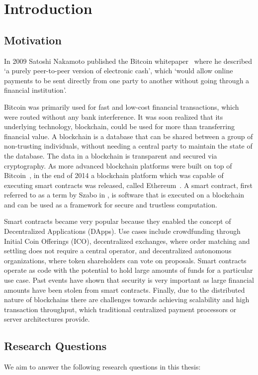 \chapter{Introduction}

\section{Motivation}
In 2009 Satoshi Nakamoto published the Bitcoin whitepaper~\cite{bitcoin} where he described `a purely peer-to-peer version of electronic cash', which `would allow online payments to be sent directly from one party to another without going through a financial institution'. 

Bitcoin was primarily used for fast and low-cost financial transactions, which were routed without any bank interference. It was soon realized that its underlying technology, blockchain, could be used for more than transferring financial value. A blockchain is a database that can be shared between a group of non-trusting individuals, without needing a central party to maintain the state of the database. The data in a blockchain is transparent and secured via cryptography. As more advanced blockchain platforms were built on top of Bitcoin~\cite{colored}, in the end of 2014 a blockchain platform which was capable of executing smart contracts was released, called Ethereum~\cite{vitalik}. A smart contract, first referred to as a term by Szabo in \cite{szabo}, is software that is executed on a blockchain and can be used as a framework for secure and trustless computation. 

Smart contracts became very popular because they enabled the concept of Decentralized Applications (DApps). Use cases include crowdfunding through Initial Coin Offerings (ICO), decentralized exchanges, where order matching and settling does not require a central operator, and decentralized autonomous organizations, where token shareholders can vote on proposals. Smart contracts operate as code with the potential to hold large amounts of funds for a particular use case. Past events have shown that security is very important as large financial amounts have been stolen from smart contracts. Finally, due to the distributed nature of blockchains there are challenges towards achieving scalability and high transaction throughput, which traditional centralized payment processors or server architectures provide. 

\section{Research Questions}
We aim to answer the following research questions in this thesis:

